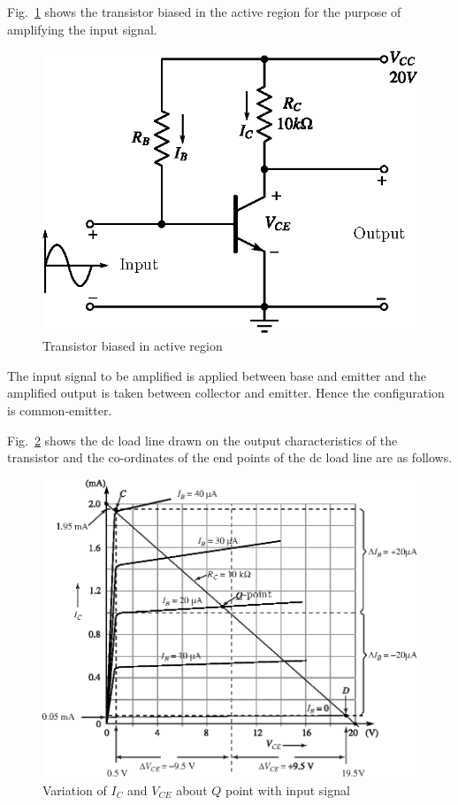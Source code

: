 Fig.~\ref{fig4.4} shows the transistor biased in the active region for the purpose of amplifying the input signal.
\begin{figure}[H]
\centering
\includegraphics[scale=.9]{chap3/fig3.4.eps}
\caption{Transistor biased in active region}\label{fig4.4}
\end{figure}

The input signal to be amplified is applied between base and emitter and the amplified output is taken between collector and emitter. Hence the configuration is common-emitter.

Fig.~\ref{fig4.5} shows the dc load line drawn on the output characteristics of the transistor and the co-ordinates of the end points of the dc load line are as follows.
\begin{figure}[H]
\centering
\includegraphics[scale=.9]{chap3/S3-EE-03-038.eps}
\caption{Variation of $I_{C}$ and $V_{CE}$ about $Q$ point with input signal}\label{fig4.5}
\end{figure}

